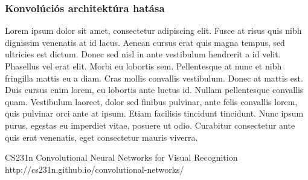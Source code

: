 \documentclass[12pt]{article}
\begin{document}
\subsubsection{Konvolúciós architektúra hatása}

Lorem ipsum dolor sit amet, consectetur adipiscing elit. Fusce at risus quis nibh dignissim venenatis at id lacus. Aenean cursus erat quis magna tempus, sed ultricies est dictum. Donec sed nisl in ante vestibulum hendrerit a id velit. Phasellus vel erat elit. Morbi eu lobortis sem. Pellentesque at nunc et nibh fringilla mattis eu a diam. Cras mollis convallis vestibulum. Donec at mattis est. Duis cursus enim lorem, eu lobortis ante luctus id. Nullam pellentesque convallis quam. Vestibulum laoreet, dolor sed finibus pulvinar, ante felis convallis lorem, quis pulvinar orci ante at ipsum. Etiam facilisis tincidunt tincidunt. Nunc ipsum purus, egestas eu imperdiet vitae, posuere ut odio. Curabitur consectetur ante quis erat venenatis, eget consectetur mauris viverra.

\begin{thebibliography}{9}

CS231n Convolutional Neural Networks for Visual Recognition
http://cs231n.github.io/convolutional-networks/

\end{thebibliography}
\end{document}
